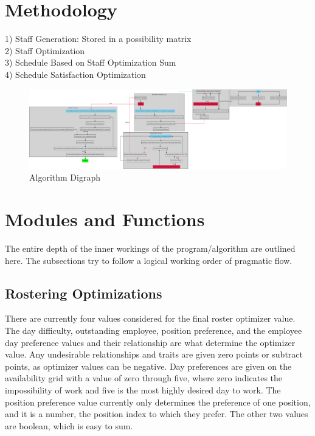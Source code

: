 \documentclass[letter,11pt]{article}
\begin{document}
\section{Methodology}

1) Staff Generation: Stored in a possibility matrix \\
2) Staff Optimization \\ 
3) Schedule Based on Staff Optimization Sum \\ 
4) Schedule Satisfaction Optimization \\ 

\begin{figure}
    \includegraphics[width=18cm]{graph.eps}
    \caption{\small Algorithm Digraph}
\end{figure}

\section{Modules and Functions}

The entire depth of the inner workings of the program/algorithm are outlined here. 
The subsections try to follow a logical working order of pragmatic flow.

\subsection{Rostering Optimizations}

There are currently four values considered for the final roster optimizer value.
The day difficulty, outstanding employee, position preference, and the employee day preference values and their relationship are what determine the optimizer value.
Any undesirable relationships and traits are given zero points or subtract points, as optimizer values can be negative.
Day preferences are given on the availability grid with a value of zero through five, where zero indicates the impossibility of work and five is the most highly desired day to work.
The position preference value currently only determines the preference of one position, and it is a number, the position index to which they prefer.
The other two values are boolean, which is easy to sum.
\end{document}
